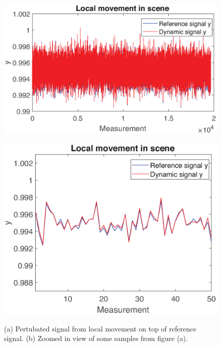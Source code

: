 \begin{figure}[H]
    \centering
\advance\leftskip-2cm
\begin{minipage}[t]{0.65\textwidth}
    \includegraphics[width=1\textwidth]{result/dynamic/local/local_whole_time1.eps}
    \subcaption{}
    \label{fig:local_sig_1}
\end{minipage}
\advance\rightskip-2.0cm
\begin{minipage}[t]{0.55\textwidth}
    \includegraphics[width = \textwidth]{result/dynamic/local/local_whole_time_win1.eps}
    \subcaption{}
    \label{fig:local_sig_2}
\end{minipage}
    \caption{(a) Pertubated signal from local movement on top of reference signal. (b) Zoomed in view of some samples from figure (a).}
    \label{fig:local_sig}
\end{figure}


